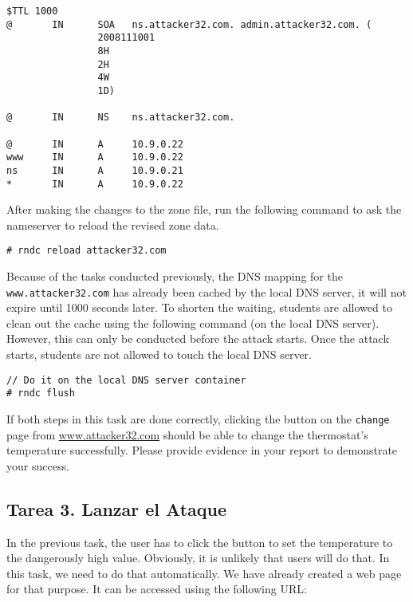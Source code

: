 \begin{lstlisting}
$TTL 1000
@       IN      SOA   ns.attacker32.com. admin.attacker32.com. (
                2008111001
                8H
                2H
                4W
                1D)

@       IN      NS    ns.attacker32.com.

@       IN      A     10.9.0.22
www     IN      A     10.9.0.22
ns      IN      A     10.9.0.21
*       IN      A     10.9.0.22
\end{lstlisting}


After making the changes to the zone file, 
run the following command to ask the nameserver 
to reload the revised zone data. 

\begin{lstlisting}
# rndc reload attacker32.com
\end{lstlisting}



Because of the tasks conducted previously, the DNS mapping for the 
\texttt{www.attacker32.com} has already been cached by the local
DNS server, it will not expire until 1000 seconds later.  To 
shorten the waiting, students are allowed to clean out the cache using the 
following command (on the local DNS server). However, this can only be 
conducted before the attack starts. Once the attack starts, students 
are not allowed to touch the local DNS server. 

\begin{lstlisting}
// Do it on the local DNS server container
# rndc flush
\end{lstlisting}
 
 
If both steps in this task are done correctly, clicking the button 
on the \texttt{change} page from \url{www.attacker32.com} should be able to change
the thermostat's temperature successfully. Please provide evidence in your report to
demonstrate your success.


\subsection{Tarea 3. Lanzar el Ataque}

In the previous task, the user has to click the button to set the 
temperature to the dangerously high value. Obviously, it is unlikely that users will 
do that.  In this task, we need to do that automatically. We have already created 
a web page for that purpose. It can be accessed using the following URL:


